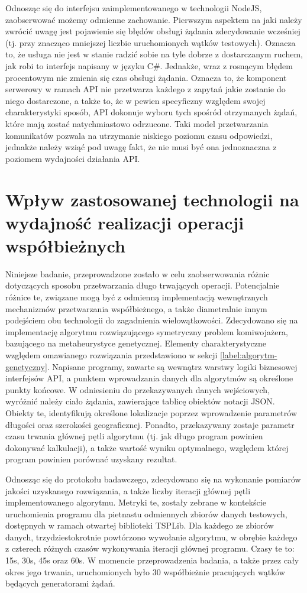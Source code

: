 Odnosząc się do interfejsu zaimplementowanego w technologii NodeJS, zaobserwować możemy odmienne zachowanie. Pierwszym aspektem na jaki należy zwrócić uwagę jest pojawienie się błędów obsługi żądania zdecydowanie wcześniej (tj. przy znacząco mniejszej liczbie uruchomionych wątków testowych). Oznacza to, że usługa nie jest w stanie radzić sobie na tyle dobrze z dostarczanym ruchem, jak robi to interfejs napisany w języku C\#. Jednakże, wraz z rosnącym błędem procentowym nie zmienia się czas obsługi żądania. Oznacza to, że komponent serwerowy w ramach API nie przetwarza każdego z zapytań jakie zostanie do niego dostarczone, a także to, że w pewien specyficzny względem swojej charakterystyki sposób, API dokonuje wyboru tych spośród otrzymanych żądań, które mają zostać natychmiastowo odrzucone. Taki model przetwarzania komunikatów pozwala na utrzymanie niskiego poziomu czasu odpowiedzi, jednakże należy wziąć pod uwagę fakt, że nie musi być ona jednoznaczna z poziomem wydajności działania API.
\section{Wpływ zastosowanej technologii na wydajność realizacji operacji współbieżnych}
Niniejsze badanie, przeprowadzone zostało w celu zaobserwowania różnic dotyczących sposobu przetwarzania długo trwających operacji. Potencjalnie różnice te, związane mogą być z odmienną implementacją wewnętrznych mechanizmów przetwarzania współbieżnego, a także diametralnie innym podejściem obu technologii do zagadnienia wielowątkowości. Zdecydowano się na implementację algorytmu rozwiązującego symetryczny problem komiwojażera, bazującego na metaheurystyce genetycznej. Elementy charakterystyczne względem omawianego rozwiązania przedstawiono w sekcji \ref{label:algorytm-genetyczny}. Napisane programy, zawarte są wewnątrz warstwy logiki biznesowej interfejsów API, a punktem wprowadzania danych dla algorytmów są określone punkty końcowe. W odniesieniu do przekazywanych danych wejściowych, wyróżnić należy ciało żądania, zawierające tablicę obiektów notacji JSON. Obiekty te, identyfikują określone lokalizacje poprzez wprowadzenie parametrów długości oraz szerokości geograficznej. Ponadto, przekazywany zostaje parametr czasu trwania głównej pętli algorytmu (tj. jak długo program powinien dokonywać kalkulacji), a także wartość wyniku optymalnego, względem której program powinien porównać uzyskany rezultat.

Odnosząc się do protokołu badawczego, zdecydowano się na wykonanie pomiarów jakości uzyskanego rozwiązania, a także liczby iteracji głównej pętli implementowanego algorytmu. Metryki te, zostały zebrane w kontekście uruchomienia programu dla pietnastu odmiennych zbiorów danych testowych, dostępnych w ramach otwartej biblioteki TSPLib. Dla każdego ze zbiorów danych, trzydziestokrotnie powtórzono wywołanie algorytmu, w obrębie każdego z czterech różnych czasów wykonywania iteracji głównej programu. Czasy te to: 15s, 30s, 45s oraz 60s. W momencie przeprowadzenia badania, a także przez cały okres jego trwania, uruchomionych było 30 współbieżnie pracujących wątków będących generatorami żądań.

